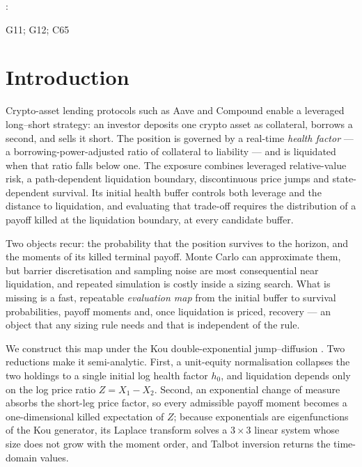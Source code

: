 \documentclass[11pt]{article}
\newenvironment{classcode}{%
  \par\addvspace{-9pt}%
  \fontsize{9}{11}\selectfont
  \setlength{\leftskip}{2pc}%
  \setlength{\rightskip}{2pc plus 1fill}%
  \noindent{\itshape JEL Classification\/}: \ignorespaces
}{%
  \par\addvspace{26pt plus 4pt}%
}
\theoremstyle{plain}
\theoremstyle{definition}
\theoremstyle{remark}
\begin{document}
\begin{classcode}
G11; G12; C65
\end{classcode}

\section{Introduction}

Crypto-asset lending protocols such as Aave and Compound enable a leveraged long--short strategy: an
investor deposits one crypto asset as collateral, borrows a second, and sells it short. The position
is governed by a real-time \emph{health factor} --- a borrowing-power-adjusted ratio of collateral to
liability --- and is liquidated when that ratio falls below one. The exposure combines leveraged
relative-value risk, a path-dependent liquidation boundary, discontinuous price jumps and
state-dependent survival. Its initial health buffer controls both leverage and the distance to
liquidation, and evaluating that trade-off requires the distribution of a payoff killed at the
liquidation boundary, at every candidate buffer.

Two objects recur: the probability that the position survives to the horizon, and the moments of its
killed terminal payoff. Monte Carlo can approximate them, but barrier discretisation and sampling
noise are most consequential near liquidation, and repeated simulation is costly inside a sizing
search. What is missing is a fast, repeatable \emph{evaluation map} from the initial buffer to
survival probabilities, payoff moments and, once liquidation is priced, recovery --- an object that
any sizing rule needs and that is independent of the rule.

We construct this map under the Kou double-exponential jump--diffusion \citep{Kou2002}. Two
reductions make it semi-analytic. First, a unit-equity normalisation collapses the two holdings to a
single initial log health factor $h_0$, and liquidation depends only on the log price ratio
$Z=X_1-X_2$. Second, an exponential change of measure absorbs the short-leg price factor, so every
admissible payoff moment becomes a one-dimensional killed expectation of $Z$; because exponentials
are eigenfunctions of the Kou generator, its Laplace transform solves a $3\times3$ linear system
whose size does not grow with the moment order, and Talbot inversion \citep{Talbot1979} returns the
time-domain values.
\end{document}
